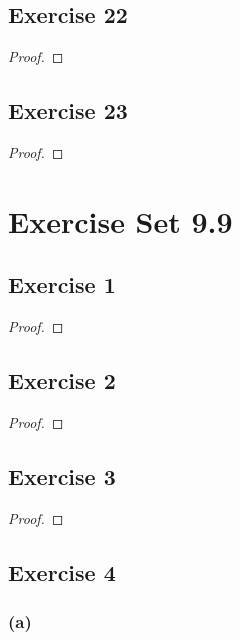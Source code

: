 \documentclass[14pt]{extarticle}
\begin{document}
\subsection{Exercise 22}

\begin{proof}

\end{proof}

\subsection{Exercise 23}

\begin{proof}

\end{proof}

\section{Exercise Set 9.9}

\subsection{Exercise 1}

\begin{proof}

\end{proof}

\subsection{Exercise 2}

\begin{proof}

\end{proof}

\subsection{Exercise 3}

\begin{proof}

\end{proof}

\subsection{Exercise 4}

\subsubsection{(a)}
\end{document}
